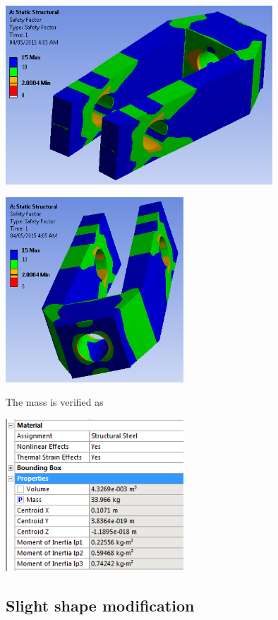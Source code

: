 \documentclass[a4paper,14pt]{extarticle}
\begin{document}
\begin{center}\includegraphics[width=0.75\textwidth]{EX_2.PNG}\end{center}

\begin{center}\includegraphics[width=0.5\textwidth]{EX_1.PNG}\end{center}

The mass is verified as

\begin{center}\includegraphics[width=0.5\textwidth]{EX_4.PNG}\end{center}
\subsection{Slight shape modification}
\end{document}
